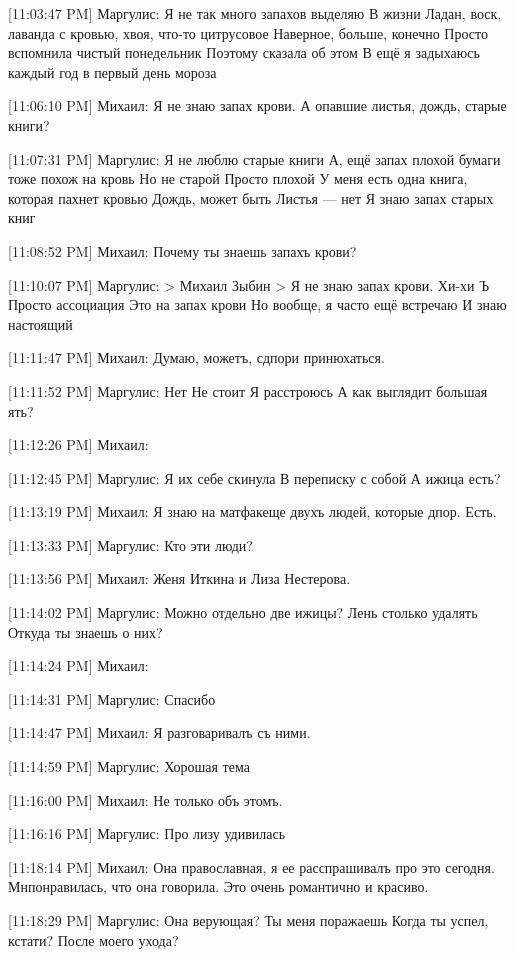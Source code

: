 \documentclass{article}
\newcommand{\yat}{{\fontencoding{X2}\selectfont\cyryat}} %
\begin{document}
{[11:03:47 PM] Маргулис:
Я не так много запахов выделяю
 В жизни
 Ладан, воск, лаванда с кровью, хвоя, что-то цитрусовое
 Наверное, больше, конечно
 Просто вспомнила чистый понедельник
 Поэтому сказала об этом
 В ещё я задыхаюсь каждый год в первый день мороза

[11:06:10 PM] Михаил:
Я не знаю запах крови.
 А опавшие листья, дождь, старые книги?

[11:07:31 PM] Маргулис:
Я не люблю старые книги
 А, ещё запах плохой бумаги тоже похож на кровь
 Но не старой
 Просто плохой
 У меня есть одна книга, которая пахнет кровью
 Дождь, может быть
 Листья — нет
 Я знаю запах старых книг

[11:08:52 PM] Михаил:
Почему ты знаешь запахъ крови?

[11:10:07 PM] Маргулис:
> Михаил Зыбин
> Я не знаю запах крови.
Хи-хи
 Ъ
 Просто ассоциация
 Это на запах крови
 Но вообще, я часто ещё встречаю
 И знаю настоящий

[11:11:47 PM] Михаил:
Думаю, можетъ, сд пор и принюхаться.

[11:11:52 PM] Маргулис:
Нет
 Не стоит
 Я расстроюсь
 А как выглядит большая ять?

[11:12:26 PM] Михаил:
\yat

[11:12:45 PM] Маргулис:
Я их себе скинула
 В переписку с собой
 А ижица есть?

[11:13:19 PM] Михаил:
Я знаю на матфак\yat еще двухъ людей, которые д пор. Есть. 


[11:13:33 PM] Маргулис:
Кто эти люди?

[11:13:56 PM] Михаил:
Женя Иткина и Лиза Нестерова.

[11:14:02 PM] Маргулис:
Можно отдельно две ижицы? Лень столько удалять
 Откуда ты знаешь о них?

[11:14:24 PM] Михаил:


[11:14:31 PM] Маргулис:
Спасибо

[11:14:47 PM] Михаил:
Я разговаривалъ съ ними.

[11:14:59 PM] Маргулис:
Хорошая тема

[11:16:00 PM] Михаил:
Не только объ этомъ.

[11:16:16 PM] Маргулис:
Про лизу удивилась

[11:18:14 PM] Михаил:
Она православная, я ее расспрашивалъ про это сегодня. Мн\yat понравилась, что она говорила. Это очень романтично и красиво.

[11:18:29 PM] Маргулис:
Она верующая?
 Ты меня поражаешь
 Когда ты успел, кстати?
 После моего ухода?

}
\end{document}
